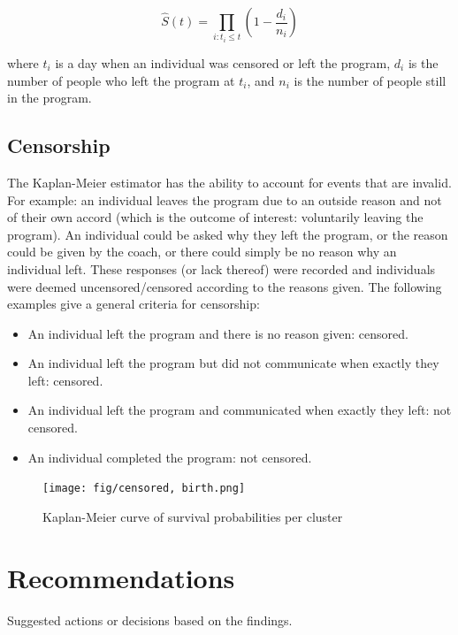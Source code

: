 \documentclass[12pt]{article}
\begin{document}
		$$
		\widehat{S}(t) = \prod_{i: t_i \leq t} \left( 1 - \frac{d_i}{n_i} \right)
		$$
		
		where $t_i$ is a day when an individual was censored or left the program, $d_i$ is the number of people who left the program at $t_i$, and $n_i$ is the number of people still in the program.
		
		
		
		\subsection{Censorship}
		
		The Kaplan-Meier estimator has the ability to account for events that are invalid. For example: an individual leaves the program due to an outside reason and not of their own accord (which is the outcome of interest: voluntarily leaving the program). An individual could be asked why they left the program, or the reason could be given by the coach, or there could simply be no reason why an individual left. These responses (or lack thereof) were recorded and individuals were deemed uncensored/censored according to the reasons given. The following examples give a general criteria for censorship:
		\begin{itemize}
			\item An individual left the program and there is no reason given: censored.
			\item An individual left the program but did not communicate when exactly they left: censored.
			\item An individual left the program and communicated when exactly they left: not censored.
			\item An individual completed the program: not censored.
		\end{itemize}
		
		\begin{figure}[h]
			\begin{center}
				\texttt{[image: fig/censored, birth.png]}
				\caption{Kaplan-Meier curve of survival probabilities per cluster}
				\label{fig:cens_surv}
			\end{center}
		\end{figure}

\section{Recommendations}

Suggested actions or decisions based on the findings.
\end{document}

